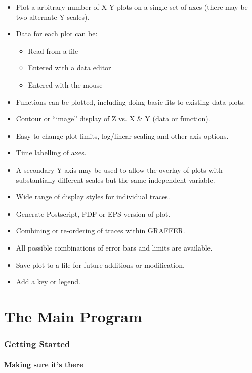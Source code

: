\documentclass[11pt,twoside,english]{article}
\begin{document}
\begin{itemize}
\item Plot a arbitrary number of X-Y plots on a single set of axes
  (there may be two alternate Y scales).
\item Data for each plot can be:
  \begin{itemize}
  \item Read from a file
  \item Entered with a data editor
  \item Entered with the mouse
  \end{itemize}
\item Functions can be plotted, including doing basic fits to existing
  data plots.
\item Contour or ``image'' display of Z vs. X \& Y (data or function).
\item Easy to change plot limits, log/linear scaling and other axis
  options.
\item Time labelling of axes.
\item A secondary Y-axis may be used to allow the overlay of plots with
  substantially different scales but the same independent variable.
\item Wide range of display styles for individual traces.
\item Generate Postscript, PDF or EPS version of plot.
\item Combining or re-ordering of traces within GRAFFER.
\item All possible combinations of error bars and limits are available.
\item Save plot to a file for future additions or modification.
\item Add a key or legend.
\end{itemize}


\part{The Main Program}
\label{part:main}


\section{Getting Started}


\subsection{Making sure it's there}
\end{document}
